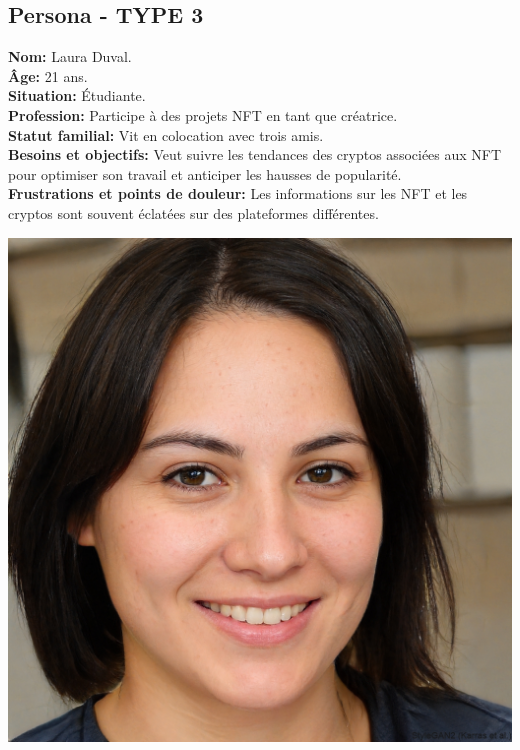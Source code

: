 \documentclass[a4paper,11pt]{article}
\begin{document}
\subsection{Persona - TYPE 3}
\begin{minipage}{0.6\textwidth} %
\textbf{Nom:} Laura Duval.\\
\textbf{Âge:} 21 ans.\\
\textbf{Situation:} Étudiante.\\
\textbf{Profession:} Participe à des projets NFT en tant que créatrice.\\
\textbf{Statut familial:} Vit en colocation avec trois amis.\\
\textbf{Besoins et objectifs:} Veut suivre les tendances des cryptos associées aux NFT pour optimiser son travail et anticiper les hausses de popularité.\\
\textbf{Frustrations et points de douleur:} Les informations sur les NFT et les cryptos sont souvent éclatées sur des plateformes différentes.\\
\end{minipage}%
\hspace{1cm}
\begin{minipage}{0.3\textwidth} %
    \begin{center}
        \includegraphics[width=\textwidth]{images/etudiante.jpeg} %
    \end{center}
\end{minipage}
\end{document}

